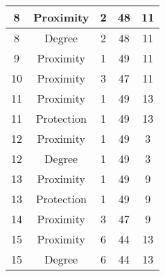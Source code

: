 \documentclass[results.tex]{subfiles}
\begin{document}
\begin{center}
\begin{tabular}{| c || c | c | c | c |}
            \hline
            8                       & Proximity                    & 2                      & 48                      & 11                   \\
            \hline
            8                       & Degree                       & 2                      & 48                      & 11                   \\
            \hline
            9                       & Proximity                    & 1                      & 49                      & 11                   \\
            \hline
            10                      & Proximity                    & 3                      & 47                      & 11                   \\
            \hline
            11                      & Proximity                    & 1                      & 49                      & 13                   \\
            \hline
            11                      & Protection                   & 1                      & 49                      & 13                   \\
            \hline
            12                      & Proximity                    & 1                      & 49                      & 3                    \\
            \hline
            12                      & Degree                       & 1                      & 49                      & 3                    \\
            \hline
            13                      & Proximity                    & 1                      & 49                      & 9                    \\
            \hline
            13                      & Protection                   & 1                      & 49                      & 9                    \\
            \hline
            14                      & Proximity                    & 3                      & 47                      & 9                    \\
            \hline
            15                      & Proximity                    & 6                      & 44                      & 13                   \\
            \hline
            15                      & Degree                       & 6                      & 44                      & 13                   \\

\end{tabular}
\end{center}
\end{document}
